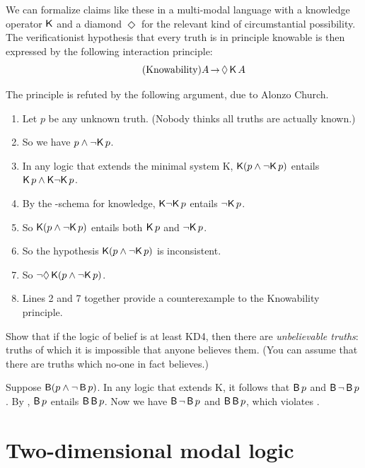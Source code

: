 We can formalize claims like these in a multi-modal language with a knowledge
operator $\operatorname{\mathsf{K}{}}$ and a diamond $\Diamond$ for the relevant kind of circumstantial
possibility. The verificationist hypothesis that every truth is in principle
knowable is then expressed by the following interaction principle:
%
\begin{equation}\tag{Knowability}
  A \to \Diamond \Kn A
\end{equation}

The principle is refuted by the following argument, due to Alonzo Church.

\begin{enumerate}[leftmargin=10mm]
  \itemsep-1mm
  \item Let $p$ be any unknown truth. (Nobody thinks all truths are actually
        known.)
  \item So we have $p \land \neg\! \operatorname{\mathsf{K}{}} p$.
  \item In any logic that extends the minimal system K,
        $\operatorname{\mathsf{K}{}}(p \land \neg\! \operatorname{\mathsf{K}{}} p)$ entails $\operatorname{\mathsf{K}{}} p \land \operatorname{\mathsf{K}{}}\! \neg \!\operatorname{\mathsf{K}{}} p$.
  \item By the -schema for knowledge, $\operatorname{\mathsf{K}{}}\! \neg \!\operatorname{\mathsf{K}{}} p$ entails
        $\neg\! \operatorname{\mathsf{K}{}} p$.
  \item So $\operatorname{\mathsf{K}{}}(p \land \neg\! \operatorname{\mathsf{K}{}} p)$ entails both $\operatorname{\mathsf{K}{}} p$ and $\neg\! \operatorname{\mathsf{K}{}} p$.
  \item So the hypothesis $\operatorname{\mathsf{K}{}}(p \land \neg\! \operatorname{\mathsf{K}{}} p)$ is inconsistent.
  \item So $\neg \Diamond \operatorname{\mathsf{K}{}}(p \land \neg\! \operatorname{\mathsf{K}{}} p)$.
  \item Lines 2 and 7 together provide a counterexample to the Knowability
        principle.
\end{enumerate}

\begin{exercise}
  Show that if the logic of belief is at least KD4, then there are
  \emph{unbelievable truths}: truths of which it is impossible that anyone
  believes them. (You can assume that there are truths which no-one in fact
  believes.)
\end{exercise}
\begin{solution}
  Suppose $\operatorname{\mathsf{B}}(p \land \neg \operatorname{\mathsf{B}} p)$. In any logic that extends K, it follows
  that $\operatorname{\mathsf{B}} p$ and $\operatorname{\mathsf{B}} \neg \operatorname{\mathsf{B}} p$. By , $\operatorname{\mathsf{B}} p$ entails
  $\operatorname{\mathsf{B}}\operatorname{\mathsf{B}} p$. Now we have $\operatorname{\mathsf{B}} \neg \operatorname{\mathsf{B}} p$ and $\operatorname{\mathsf{B}}\operatorname{\mathsf{B}} p$, which violates .
\end{solution}

\section{Two-dimensional modal logic}\label{sec:2d}

